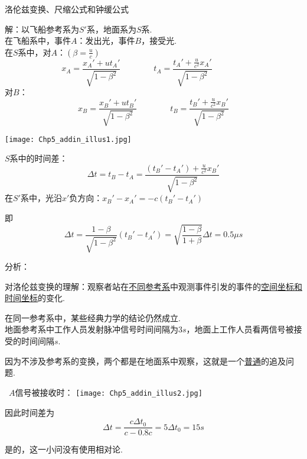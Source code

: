 \documentclass[a4paper, opensource]{./template/qyxf-book}
\begin{document}
\begin{section}{洛伦兹变换、尺缩公式和钟缓公式}
\solve
\begin{multicols}{2}
解：以飞船参考系为$S'$系，地面系为$S$系.\\
在飞船系中，事件$A$：发出光，事件$B$，接受光.\\
在$S$系中，对$A$：$(\beta=\frac{u}{c})$
\begin{equation*}
x_A=\frac{x_A'+ut_A'}{\sqrt{1-\beta^2}} \hspace{4em} 
t_A=\frac{t_A'+\frac{u}{c^2}x_A'}{\sqrt{1-\beta^2}} \hspace{4em}
\end{equation*}
对$B$：
\begin{equation*}
x_B=\frac{x_B'+ut_B'}{\sqrt{1-\beta^2}} \hspace{4em}
t_B=\frac{t_B'+\frac{u}{c^2}x_B'}{\sqrt{1-\beta^2}}
\end{equation*}

\hspace{4em}
\texttt{[image: Chp5\_addin\_illus1.jpg]}
\end{multicols}

$S$系中的时间差：
\begin{equation*}
\Delta t = t_B - t_A = \frac{(t_B'-t_A')+\frac{u}{c^2}x_B'}{\sqrt{1-\beta^2}}
\end{equation*}
在$S'$系中，光沿$x'$负方向：$x_B'-x_A'=-c(t_B'-t_A')$

即
\begin{equation*}
\Delta t=\frac{1-\beta}{\sqrt{1-\beta^2}}(t_B'-t_A')=\sqrt{\frac{1-\beta}{1+\beta}}\Delta t
=0.5\mu s
\end{equation*}

分析：

对洛伦兹变换的理解：观察者站在\underline{不同参考系}中观测事件引发的事件的\underline{空间坐标和时间坐标}的变化.

在同一参考系中，某些经典力学的结论仍然成立.\\

地面参考系中工作人员发射脉冲信号时间间隔为$3s$，地面上工作人员看两信号被接受的时间间隔\underline{\hspace{2em}}$s$.

\solve
因为不涉及参考系的变换，两个都是在地面系中观察，这就是一个\underline{\underline{普通}}的追及问题.

\
$A$信号被接收时：\qquad
\texttt{[image: Chp5\_addin\_illus2.jpg]}

因此时间差为
\begin{equation*}
\Delta t=\frac{c\Delta t_0}{c-0.8c}=5\Delta t_0=15s
\end{equation*}

是的，这一小问没有使用相对论.


\end{section}
\end{document}
